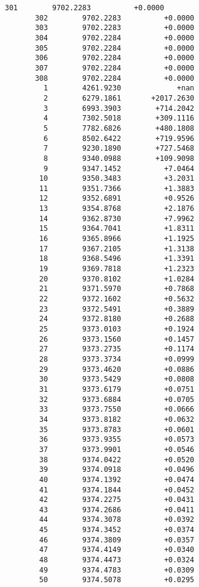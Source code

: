 \documentclass[11pt]{article}
\begin{document}
\begin{Verbatim}[commandchars=\\\{\}]
       301        9702.2283          +0.0000
       302        9702.2283          +0.0000
       303        9702.2283          +0.0000
       304        9702.2284          +0.0000
       305        9702.2284          +0.0000
       306        9702.2284          +0.0000
       307        9702.2284          +0.0000
       308        9702.2284          +0.0000
         1        4261.9230             +nan
         2        6279.1861       +2017.2630
         3        6993.3903        +714.2042
         4        7302.5018        +309.1116
         5        7782.6826        +480.1808
         6        8502.6422        +719.9596
         7        9230.1890        +727.5468
         8        9340.0988        +109.9098
         9        9347.1452          +7.0464
        10        9350.3483          +3.2031
        11        9351.7366          +1.3883
        12        9352.6891          +0.9526
        13        9354.8768          +2.1876
        14        9362.8730          +7.9962
        15        9364.7041          +1.8311
        16        9365.8966          +1.1925
        17        9367.2105          +1.3138
        18        9368.5496          +1.3391
        19        9369.7818          +1.2323
        20        9370.8102          +1.0284
        21        9371.5970          +0.7868
        22        9372.1602          +0.5632
        23        9372.5491          +0.3889
        24        9372.8180          +0.2688
        25        9373.0103          +0.1924
        26        9373.1560          +0.1457
        27        9373.2735          +0.1174
        28        9373.3734          +0.0999
        29        9373.4620          +0.0886
        30        9373.5429          +0.0808
        31        9373.6179          +0.0751
        32        9373.6884          +0.0705
        33        9373.7550          +0.0666
        34        9373.8182          +0.0632
        35        9373.8783          +0.0601
        36        9373.9355          +0.0573
        37        9373.9901          +0.0546
        38        9374.0422          +0.0520
        39        9374.0918          +0.0496
        40        9374.1392          +0.0474
        41        9374.1844          +0.0452
        42        9374.2275          +0.0431
        43        9374.2686          +0.0411
        44        9374.3078          +0.0392
        45        9374.3452          +0.0374
        46        9374.3809          +0.0357
        47        9374.4149          +0.0340
        48        9374.4473          +0.0324
        49        9374.4783          +0.0309
        50        9374.5078          +0.0295

\end{Verbatim}
\end{document}
